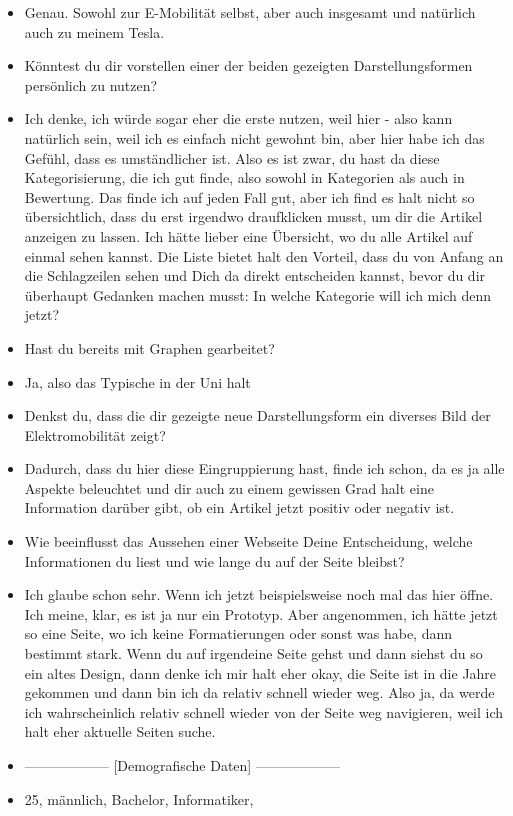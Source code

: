 {\begin{itemize}[]
        \item {} Genau.
              Sowohl zur E-Mobilität selbst, aber auch insgesamt und natürlich auch zu meinem Tesla.
        \item {} Könntest du dir vorstellen einer der beiden gezeigten Darstellungsformen persönlich zu nutzen?
        \item {} Ich denke, ich würde sogar eher die erste nutzen, weil hier - also kann natürlich sein, weil ich es einfach nicht gewohnt bin, aber hier habe ich das Gefühl, dass es umständlicher ist.
              Also es ist zwar, du hast da diese Kategorisierung, die ich gut finde, also sowohl in Kategorien als auch in Bewertung.
              Das finde ich auf jeden Fall gut, aber ich find es halt nicht so übersichtlich, dass du erst irgendwo draufklicken musst, um dir die Artikel anzeigen zu lassen.
              Ich hätte lieber eine Übersicht, wo du alle Artikel auf einmal sehen kannst.
              Die Liste bietet halt den Vorteil, dass du von Anfang an die Schlagzeilen sehen und Dich da direkt entscheiden kannst, bevor du dir überhaupt Gedanken machen musst: In welche Kategorie will ich mich denn jetzt?
        \item {} Hast du bereits mit Graphen gearbeitet?
        \item {} Ja, also das Typische in der Uni halt
        \item {} Denkst du, dass die dir gezeigte neue Darstellungsform ein diverses Bild der Elektromobilität zeigt?
        \item {} Dadurch, dass du hier diese Eingruppierung hast, finde ich schon, da es ja alle Aspekte beleuchtet und dir auch zu einem gewissen Grad halt eine Information darüber gibt, ob ein Artikel jetzt positiv oder negativ ist.
        \item {} Wie beeinflusst das Aussehen einer Webseite Deine Entscheidung, welche Informationen du liest und wie lange du auf der Seite bleibst?
        \item {} Ich glaube schon sehr.
              Wenn ich jetzt beispielsweise noch mal das hier öffne.
              Ich meine, klar, es ist ja nur ein Prototyp.
              Aber angenommen, ich hätte jetzt so eine Seite, wo ich keine Formatierungen oder sonst was habe, dann bestimmt stark.
              Wenn du auf irgendeine Seite gehst und dann siehst du so ein altes Design, dann denke ich mir halt eher okay, die Seite ist in die Jahre gekommen und dann bin ich da relativ schnell wieder weg.
              Also ja, da werde ich wahrscheinlich relativ schnell wieder von der Seite weg navigieren, weil ich halt eher aktuelle Seiten suche.
        \item {------------------} [Demografische Daten] {------------------}
        \item {} 25, männlich, Bachelor, Informatiker,
    \end{itemize}}
\nolinenumbers

